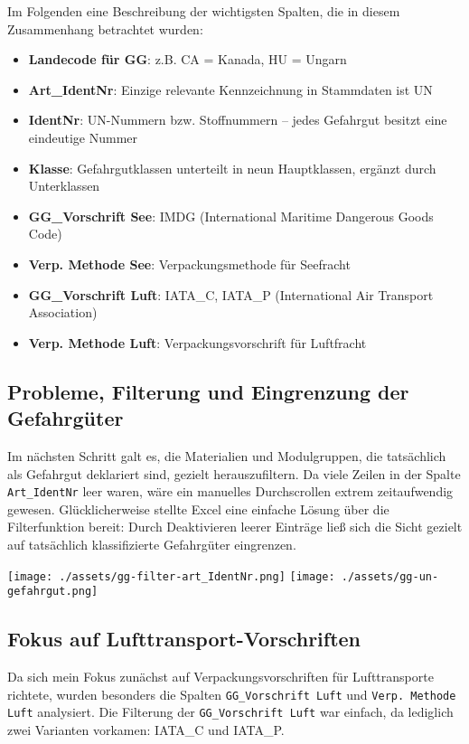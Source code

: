Im Folgenden eine Beschreibung der wichtigsten Spalten, die in diesem Zusammenhang betrachtet wurden:

\begin{itemize}
  \item \textbf{Landecode für GG}: z.B. CA = Kanada, HU = Ungarn
  \item \textbf{Art\_IdentNr}: Einzige relevante Kennzeichnung in Stammdaten ist \glqq UN\grqq
  \item \textbf{IdentNr}: UN-Nummern bzw. Stoffnummern – jedes Gefahrgut besitzt eine eindeutige Nummer
  \item \textbf{Klasse}: Gefahrgutklassen unterteilt in neun Hauptklassen, ergänzt durch Unterklassen 
  \item \textbf{GG\_Vorschrift See}: IMDG (International Maritime Dangerous Goods Code)
  \item \textbf{Verp. Methode See}: Verpackungsmethode für Seefracht
  \item \textbf{GG\_Vorschrift Luft}: IATA\_C, IATA\_P (International Air Transport Association)
  \item \textbf{Verp. Methode Luft}: Verpackungsvorschrift für Luftfracht
\end{itemize}

\subsection{Probleme, Filterung und Eingrenzung der Gefahrgüter}
Im nächsten Schritt galt es, die Materialien und Modulgruppen, die tatsächlich als Gefahrgut deklariert sind, 
gezielt herauszufiltern. Da viele Zeilen in der Spalte \texttt{Art\_IdentNr} leer waren, wäre ein manuelles 
Durchscrollen extrem zeitaufwendig gewesen. Glücklicherweise stellte Excel eine einfache Lösung über die Filterfunktion 
bereit: Durch Deaktivieren leerer Einträge ließ sich die Sicht gezielt auf tatsächlich klassifizierte Gefahrgüter 
eingrenzen.

\begin{center}
  \texttt{[image: ./assets/gg-filter-art\_IdentNr.png]}
  \texttt{[image: ./assets/gg-un-gefahrgut.png]}
\end{center}


\subsection{Fokus auf Lufttransport-Vorschriften}
Da sich mein Fokus zunächst auf Verpackungsvorschriften für Lufttransporte richtete, wurden besonders die 
Spalten \texttt{GG\_Vorschrift Luft} und \texttt{Verp. Methode Luft} analysiert. Die Filterung der 
\texttt{GG\_Vorschrift Luft} war einfach, da lediglich zwei Varianten vorkamen: IATA\_C und IATA\_P.


